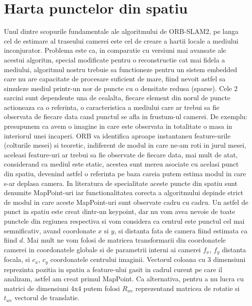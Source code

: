 \documentclass[12pt,a4paper]{report}
\begin{document}
\section{Harta punctelor din spatiu}
Unul dintre scopurile fundamentale ale algoritmului de ORB-SLAM2, pe langa cel 
de estimare al traseului camerei este cel de creare a hartii locale a mediului
inconjurator. Problema este ca, in comparatie cu versiuni mai avansate ale
acestui algoritm, special modificate pentru o reconstructie cat mai fidela a mediului,
algoritmul nostru trebuie sa functioneze pentru un sistem embedded care nu are 
capacitate de procesare suficient de mare, fiind nevoit astfel sa simuleze mediul 
printr-un nor de puncte cu o densitate redusa (sparse). Cele 2 sarcini sunt 
dependente una de cealalta, fiecare element din norul de puncte actioneaza ca
o referinta, o caracteristica a mediului care ar trebui sa fie observata de fiecare 
data cand punctul se afla in frustum-ul camerei. De exemplu: presupunem ca avem
o imagine in care este observata in totalitate o masa in interiorul unei incaperi. 
ORB va identifica aproape instantaneu feature-urile (colturile mesei) si teoretic,
indiferent de modul in care ne-am roti in jurul mesei, aceleasi feature-uri
ar trebui sa fie observate de fiecare data, mai mult de atat, considerand ca mediul 
este static, acestea sunt mereu asociate cu acelasi punct din spatiu, devenind astfel 
o referinta pe baza careia putem estima modul in care s-ar deplasa camera. 
In literatura de specialitate aceste puncte din spatiu sunt  denumite MapPoint-uri 
iar functionalitatea corecta a algoritmului depinde strict de 
modul in care aceste MapPoint-uri sunt observate cadru cu cadru. Un astfel de punct 
in spatiu este creat dintr-un keypoint, dar nu vom avea nevoie de toate punctele din 
regiunea respectiva si vom considera ca centrul este punctul cel mai semnificativ,  
avand coordonate \(x\) si \(y\), si distanta fata de camera fiind estimata ca fiind 
\(d\). Mai mult ne vom folosi de matricea transformarii din coordonatele camerei
in coordonatele globale si de parametrii interni ai camerei \(f_x\), \(f_y\) 
distanta focala, si \(c_x\), \(c_y\) coordonatele centrului imaginii.
Vectorul coloana cu 3 dimensiuni reprezinta pozitia in spatiu a feature-ului gasit
in cadrul curent pe care il analizam, astfel am creat primul MapPoint. Ca alternativa,
pentru a nu lucra cu matrici de dimensiuni 4x4 putem folosi \(R_{wc}\) reprezentand
matricea de rotatie si \(t_{wc}\) vectorul de translatie.
\end{document}
